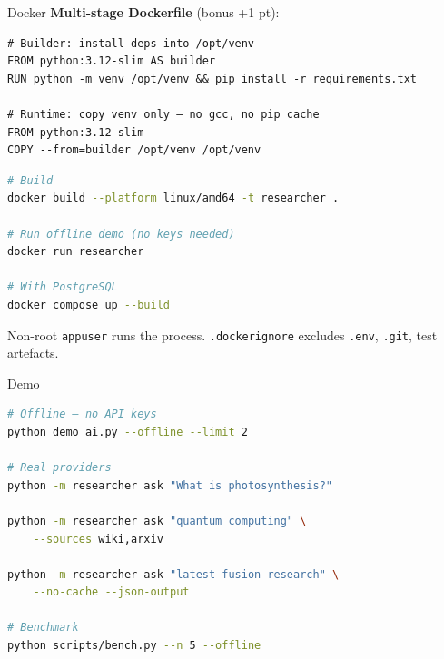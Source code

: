\documentclass[aspectratio=169]{beamer}
\begin{document}
\begin{frame}[fragile]{Docker}
\textbf{Multi-stage Dockerfile} (bonus +1 pt):

\begin{lstlisting}
# Builder: install deps into /opt/venv
FROM python:3.12-slim AS builder
RUN python -m venv /opt/venv && pip install -r requirements.txt

# Runtime: copy venv only — no gcc, no pip cache
FROM python:3.12-slim
COPY --from=builder /opt/venv /opt/venv
\end{lstlisting}

\vspace{0.5em}
\begin{lstlisting}[language=bash]
# Build
docker build --platform linux/amd64 -t researcher .

# Run offline demo (no keys needed)
docker run researcher

# With PostgreSQL
docker compose up --build
\end{lstlisting}

Non-root \texttt{appuser} runs the process. \texttt{.dockerignore} excludes \texttt{.env}, \texttt{.git}, test artefacts.
\end{frame}

\begin{frame}[fragile]{Demo}
\begin{lstlisting}[language=bash]
# Offline — no API keys
python demo_ai.py --offline --limit 2

# Real providers
python -m researcher ask "What is photosynthesis?"

python -m researcher ask "quantum computing" \
    --sources wiki,arxiv

python -m researcher ask "latest fusion research" \
    --no-cache --json-output

# Benchmark
python scripts/bench.py --n 5 --offline
\end{lstlisting}
\end{frame}
\end{document}
